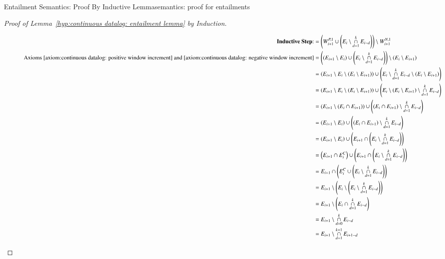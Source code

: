 \begin{nestedsection}{Entailment Semantics: Proof By Inductive Lemma}{semantics: proof for entailments}
\begin{proof}[Proof of Lemma~\ref{hyp:continuous datalog: entailment lemma} by Induction]
\begin{figure*}[p]
\begin{align*}
				\text{\textbf{Inductive Step}:}& = \left( W^{P,1}_{i+1} \cup \left( E_{i} \setminus \mathop{\cap}^{k}_{d=1} E_{i-d} \right) \right) \setminus W^{N,1}_{i+1} \\
				\text{Axioms~\ref{axiom:continuous datalog: positive window increment}~and~\ref{axiom:continuous datalog: negative window increment}} & = \left( \left( E_{i+1} \setminus E_{i} \right) \cup \left( E_{i} \setminus \mathop{\cap}^{k}_{d=1} E_{i-d} \right) \right) \setminus \left( E_{i} \setminus E_{i+1} \right) \\
				& = \left( E_{i+1} \setminus E_{i} \setminus \left( E_{i} \setminus E_{i+1} \right) \right) \cup \left( E_{i} \setminus \mathop{\cap}^{k}_{d=1} E_{i-d} \setminus \left( E_{i} \setminus E_{i+1} \right) \right) \\
				& = \left( E_{i+1} \setminus E_{i} \setminus \left( E_{i} \setminus E_{i+1} \right) \right) \cup \left( E_{i} \setminus \left( E_{i} \setminus E_{i+1} \right) \setminus \mathop{\cap}^{k}_{d=1} E_{i-d} \right) \\
				& = \left( E_{i+1} \setminus \left( E_{i} \cap E_{i+1} \right) \right) \cup \left( \left( E_{i} \cap E_{i+1} \right) \setminus \mathop{\cap}^{k}_{d=1} E_{i-d} \right) \\
				& = \left( E_{i+1} \setminus E_{i} \right) \cup \left( \left( E_{i} \cap E_{i+1} \right) \setminus \mathop{\cap}^{k}_{d=1} E_{i-d} \right) \\
				& = \left( E_{i+1} \setminus E_{i} \right) \cup \left( E_{i+1} \cap \left( E_{i} \setminus \mathop{\cap}^{k}_{d=1} E_{i-d} \right) \right) \\
				& = \left( E_{i+1} \cap E^C_{i} \right) \cup \left( E_{i+1} \cap \left( E_{i} \setminus \mathop{\cap}^{k}_{d=1} E_{i-d} \right) \right)\\
				& = E_{i+1} \cap \left( E^C_{i} \cup \left( E_{i} \setminus \mathop{\cap}^{k}_{d=1} E_{i-d} \right) \right) \\
				& = E_{i+1} \setminus \left( E_{i} \setminus \left( E_{i} \setminus \mathop{\cap}^{k}_{d=1} E_{i-d} \right) \right) \\
				& = E_{i+1} \setminus \left( E_{i} \cap \mathop{\cap}^{k}_{d=1} E_{i-d} \right) \\
				& = E_{i+1} \setminus \mathop{\cap}^{k}_{d=0} E_{i-d} \\
				& = E_{i+1} \setminus \mathop{\cap}^{k+1}_{d=1} E_{i+1-d} \qedhere
			\end{align*}
		\end{figure*}
	\end{proof}
\end{nestedsection}